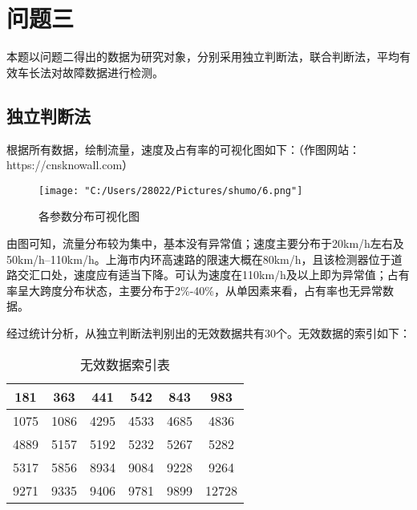 \documentclass[withoutpreface,bwprint]{cumcmthesis} %
\begin{document}
\section{问题三}
本题以问题二得出的数据为研究对象，分别采用独立判断法，联合判断法，平均有效车长法对故障数据进行检测。

    \subsection{独立判断法}
    根据所有数据，绘制流量，速度及占有率的可视化图如下：（作图网站：https://cnsknowall.com）\par
    \begin{figure}[!htbp] 
        \centering
        \texttt{[image: "C:/Users/28022/Pictures/shumo/6.png"]}
        \caption{各参数分布可视化图}
        \label{fig:your_label}
    \end{figure}
    由图可知，流量分布较为集中，基本没有异常值；速度主要分布于20km/h左右及50km/h--110km/h。上海市内环高速路的限速大概在80km/h，且该检测器位于道路交汇口处，速度应有适当下降。可认为速度在110km/h及以上即为异常值；占有率呈大跨度分布状态，主要分布于2\%-40\%，从单因素来看，占有率也无异常数据。\par
    经过统计分析，从独立判断法判别出的无效数据共有30个。无效数据的索引如下：\par
        \begin{table}[!htbp]
            \centering
            \caption{无效数据索引表}
            \begin{tabular}{|c|c|c|c|c|c|}
                \hline
                181 & 363 & 441 & 542 & 843 & 983 \\ \hline
                1075 & 1086 & 4295 & 4533 & 4685 & 4836 \\ \hline
                4889 & 5157 & 5192 & 5232 & 5267 & 5282 \\ \hline
                5317 & 5856 & 8934 &9084 & 9228 & 9264 \\ \hline
                9271 & 9335 & 9406 & 9781 & 9899 & 12728 \\ \hline
                \end{tabular}
        \end{table}\par
\end{document}
